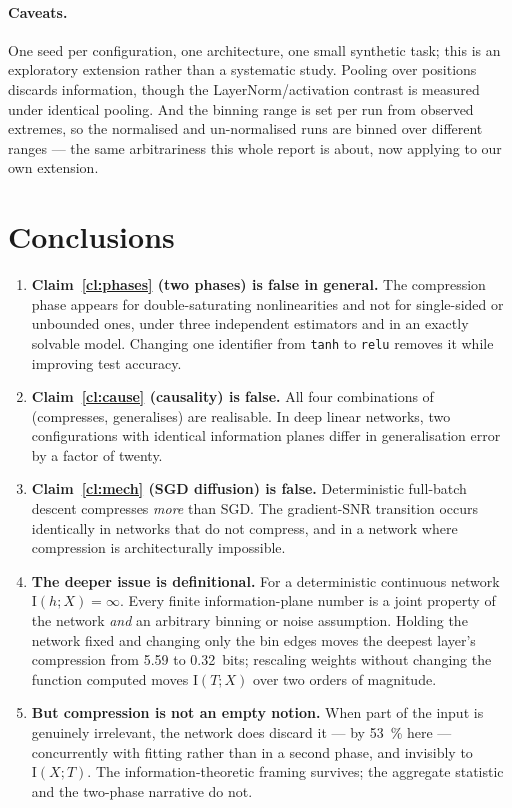 \documentclass[11pt,a4paper]{article}
\newcommand{\I}{\mathrm{I}}
\begin{document}
\paragraph{Caveats.} One seed per configuration, one architecture, one small
synthetic task; this is an exploratory extension rather than a systematic study.
Pooling over positions discards information, though the LayerNorm/activation
contrast is measured under identical pooling. And the binning range is set per run
from observed extremes, so the normalised and un-normalised runs are binned over
different ranges --- the same arbitrariness this whole report is about, now
applying to our own extension.

\section{Conclusions}

\begin{enumerate}[topsep=2pt,itemsep=3pt]
  \item \textbf{Claim~\ref{cl:phases} (two phases) is false in general.} The
    compression phase appears for double-saturating nonlinearities and not for
    single-sided or unbounded ones, under three independent estimators and in an
    exactly solvable model. Changing one identifier from \texttt{tanh} to
    \texttt{relu} removes it while improving test accuracy.
  \item \textbf{Claim~\ref{cl:cause} (causality) is false.} All four combinations
    of (compresses, generalises) are realisable. In deep linear networks, two
    configurations with identical information planes differ in generalisation
    error by a factor of twenty.
  \item \textbf{Claim~\ref{cl:mech} (SGD diffusion) is false.} Deterministic
    full-batch descent compresses \emph{more} than SGD. The gradient-SNR
    transition occurs identically in networks that do not compress, and in a
    network where compression is architecturally impossible.
  \item \textbf{The deeper issue is definitional.} For a deterministic continuous
    network $\I(h;X)=\infty$. Every finite information-plane number is a joint
    property of the network \emph{and} an arbitrary binning or noise assumption.
    Holding the network fixed and changing only the bin edges moves the deepest
    layer's compression from \SI{5.59}{} to \SI{0.32}{bits}; rescaling weights
    without changing the function computed moves $\I(T;X)$ over two orders of
    magnitude.
  \item \textbf{But compression is not an empty notion.} When part of the input
    is genuinely irrelevant, the network does discard it --- by
    \SI{53}{\percent} here --- concurrently with fitting rather than in a second
    phase, and invisibly to $\I(X;T)$. The information-theoretic framing survives;
    the aggregate statistic and the two-phase narrative do not.
\end{enumerate}
\end{document}
